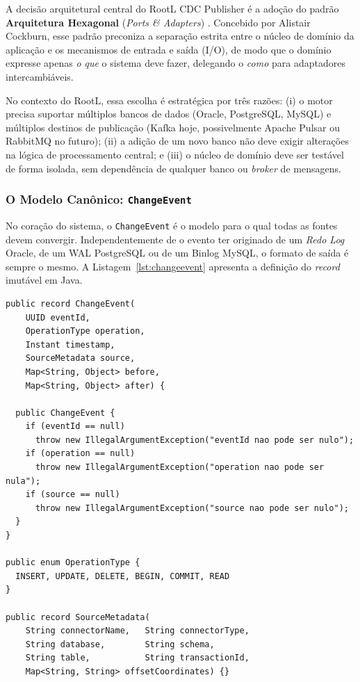 \documentclass[12pt]{article}
\begin{document}
A decisão arquitetural central do RootL CDC Publisher é a adoção do padrão
\textbf{Arquitetura Hexagonal} (\textit{Ports \& Adapters})
\cite{cockburn:2005}. Concebido por Alistair Cockburn, esse padrão preconiza
a separação estrita entre o núcleo de domínio da aplicação e os mecanismos
de entrada e saída (I/O), de modo que o domínio expresse apenas \textit{o que}
o sistema deve fazer, delegando o \textit{como} para adaptadores
intercambiáveis.

No contexto do RootL, essa escolha é estratégica por três razões:
(i) o motor precisa suportar múltiplos bancos de dados (Oracle, PostgreSQL,
MySQL) e múltiplos destinos de publicação (Kafka hoje, possivelmente Apache
Pulsar ou RabbitMQ no futuro); (ii) a adição de um novo banco não deve
exigir alterações na lógica de processamento central; e (iii) o núcleo de
domínio deve ser testável de forma isolada, sem dependência de qualquer banco
ou \textit{broker} de mensagens.

\subsubsection{O Modelo Canônico: \texttt{ChangeEvent}}

No coração do sistema, o \texttt{ChangeEvent} é o modelo para o qual todas
as fontes devem convergir. Independentemente de o evento ter originado de
um \textit{Redo Log} Oracle, de um WAL PostgreSQL ou de um Binlog MySQL,
o formato de saída é sempre o mesmo. A Listagem~\ref{lst:changeevent}
apresenta a definição do \textit{record} imutável em Java.

\begin{lstlisting}[style=javastyle,
  caption={Modelo canônico \texttt{ChangeEvent} e tipos auxiliares.},
  label={lst:changeevent}]
public record ChangeEvent(
    UUID eventId,
    OperationType operation,
    Instant timestamp,
    SourceMetadata source,
    Map<String, Object> before,
    Map<String, Object> after) {

  public ChangeEvent {
    if (eventId == null)
      throw new IllegalArgumentException("eventId nao pode ser nulo");
    if (operation == null)
      throw new IllegalArgumentException("operation nao pode ser nula");
    if (source == null)
      throw new IllegalArgumentException("source nao pode ser nulo");
  }
}

public enum OperationType {
  INSERT, UPDATE, DELETE, BEGIN, COMMIT, READ
}

public record SourceMetadata(
    String connectorName,   String connectorType,
    String database,        String schema,
    String table,           String transactionId,
    Map<String, String> offsetCoordinates) {}
\end{lstlisting}
\end{document}
